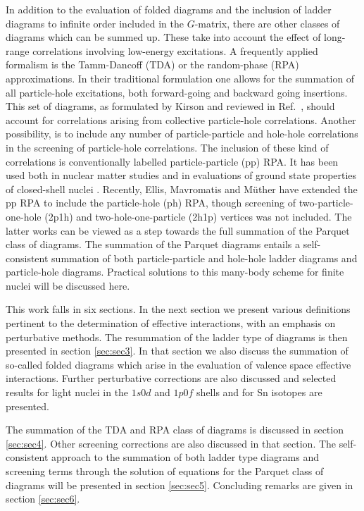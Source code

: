 In addition to the evaluation of folded diagrams and the inclusion
of ladder diagrams to infinite order included in the $G$-matrix, there
are other classes of diagrams which can be summed up.
These take into account
the effect of long-range correlations involving low-energy excitations.
A frequently applied formalism is
the Tamm-Dancoff (TDA) or the random-phase
(RPA) approximations. In their traditional formulation one allows
for the summation of all particle-hole excitations, both forward-going
and backward going insertions.
This set of diagrams, as formulated by Kirson \cite{kirson74} and reviewed
in Ref.\ \cite{eo77}, should account for correlations  arising
from collective particle-hole correlations. Another possibility,
is to include any number of particle-particle and hole-hole 
correlations in the screening of particle-hole correlations. 
The inclusion of these kind of correlations is conventionally labelled
particle-particle (pp) RPA. It has been used both in nuclear matter
studies \cite{angels88,rpd89,yhk86,syk87}
and in evaluations of ground state properties of closed-shell
nuclei \cite{hmtk87,emm91,hmm95}.
Recently, Ellis, Mavromatis and M\"uther \cite{emm91,hmm95} have
extended the pp RPA to include the particle-hole (ph) RPA, though
screening of two-particle-one-hole (2p1h) and two-hole-one-particle
(2h1p) vertices was not included.
The latter works can be viewed as a step towards the full summation of the
Parquet class of diagrams. 
The summation of the Parquet diagrams entails a self-consistent
summation of both particle-particle and hole-hole ladder diagrams
and particle-hole diagrams. Practical solutions to this many-body
scheme for finite nuclei will be discussed here.

This work falls in six sections.
In the next section we present various definitions pertinent
to the determination of effective interactions, with an emphasis
on perturbative methods.
The resummation of the ladder type of 
diagrams is then presented in section \ref{sec:sec3}.
In that section we also discuss the summation of so-called
folded diagrams which arise in the evaluation of 
valence space effective interactions. Further perturbative 
corrections are also discussed and selected results
for light nuclei in the $1s0d$ and $1p0f$ shells and for
Sn isotopes are presented.

The summation of the TDA and RPA class of diagrams is discussed in
section \ref{sec:sec4}. Other screening corrections are also
discussed in that section. The self-consistent approach to the 
summation of both ladder type diagrams and screening terms 
through the solution    
of equations for the Parquet class of diagrams will be presented
in section \ref{sec:sec5}. 
Concluding remarks are given in section \ref{sec:sec6}.



